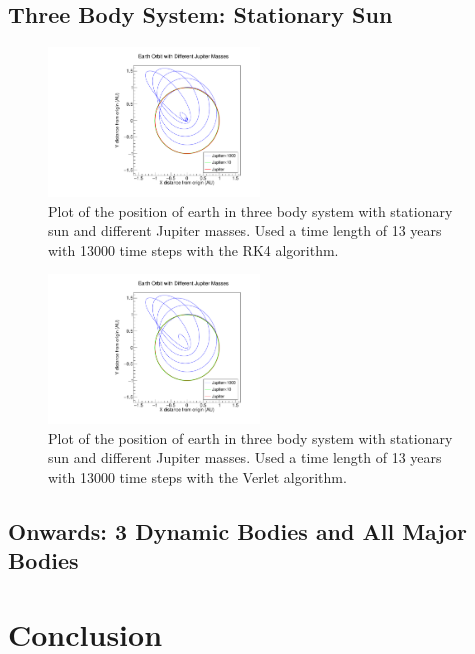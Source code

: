 \documentclass[a4paper,12pt]{report}
\begin{document}
\subsection{Three Body System: Stationary Sun}

\begin{figure}
 \centering
   \includegraphics[width=0.5\textwidth]{ESJFRK4_Earths.pdf}
  \caption{Plot of the position of earth in three body system with stationary sun and different Jupiter masses. Used a time length of 13 years with 13000 time steps with the RK4 algorithm.}
  \label{fig:ESJFRK4_Earths}
 \end{figure}

 \begin{figure}
 \centering
   \includegraphics[width=0.5\textwidth]{ESJFVerlet_Earths.pdf}
  \caption{Plot of the position of earth in three body system with stationary sun and different Jupiter masses. Used a time length of 13 years with 13000 time steps with the Verlet algorithm.}
  \label{fig:ESJFVerlet_Earths}
 \end{figure}


\subsection{Onwards: 3 Dynamic Bodies and All Major Bodies}

\section{Conclusion}\label{sec:conclude}
\end{document}
